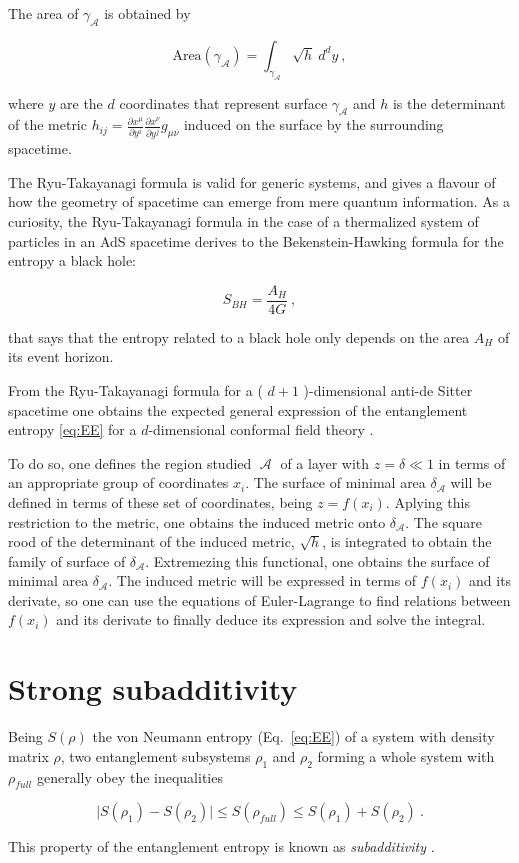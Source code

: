 \documentclass[twocolumn]{revtex4}
\providecommand{\abs}[1]{\lvert#1\rvert}
\providecommand{\eq}[2]{
    \begin{equation}
        #2
    \label{eq:#1}
    \end{equation}
}
\DeclareMathOperator{\calA}{\mathcal{A}}
\begin{document}
The area of $\gamma_{\calA}$ is obtained by
\eq{EE_RT-area}{
    \text{Area}(\gamma_{\calA}) = \int_{\gamma_{\calA}} \sqrt{h} \ d^{d}y \ ,
}
where $y$ are the $d$ coordinates that represent surface $\gamma_{\calA}$ and $h$ is the determinant of the metric $h_{ij} = \frac{\partial x^\mu}{\partial y^i} \frac{\partial x^\nu}{\partial y^j} g_{\mu\nu}$ induced on the surface by the surrounding spacetime.

The Ryu-Takayanagi formula is valid for generic systems, and gives a flavour of how the geometry of spacetime can emerge from mere quantum information. As a curiosity, the Ryu-Takayanagi formula in the case of a thermalized system of particles in an AdS spacetime derives to the Bekenstein-Hawking formula \cite{bekenstein_black_1973} for the entropy a black hole:
\eq{BH}{
    S_{BH} = \frac{ A_H }{ 4 G } \ ,
}
that says that the entropy related to a black hole only depends on the area $A_H$ of its event horizon.

From the Ryu-Takayanagi formula for a ( $d+1$ )-dimensional anti-de Sitter spacetime one obtains the expected general expression of the entanglement entropy \ref{eq:EE} for a $d$-dimensional conformal field theory \cite{}.

To do so, one defines the region studied $\calA$ of a layer with $z = \delta \ll 1$ in terms of an appropriate group of coordinates $x_i$. The surface of minimal area $\delta_{\calA}$ will be defined in terms of these set of coordinates, being $z = f (x_i)$. Aplying this restriction to the metric, one obtains the induced metric onto $\delta_{\calA}$. The square rood of the determinant of the induced metric, $\sqrt{h}$, is integrated to obtain the family of surface of $\delta_{\calA}$. Extremezing this functional, one obtains the surface of minimal area $\delta_{\calA}$. The induced metric will be expressed in terms of $f(x_i)$ and its derivate, so one can use the equations of Euler-Lagrange to find relations between $f (x_i)$ and its derivate to finally deduce its expression and solve the integral.


\section{Strong subadditivity} \label{s:SS}

Being $S(\rho)$ the von Neumann entropy (Eq.~\ref{eq:EE}) of a system with density matrix $\rho$, two entanglement subsystems $\rho_1$ and $\rho_2$ forming a whole system with $\rho_{full}$ generally obey the inequalities
\eq{EE_subadd}{
    \abs{S(\rho_1)-S(\rho_2)} \le S(\rho_{full}) \le S(\rho_1) + S(\rho_2) \ .
}
This property of the entanglement entropy is known as \textit{subadditivity} \cite{headrick_holographic_2007}.
\end{document}
